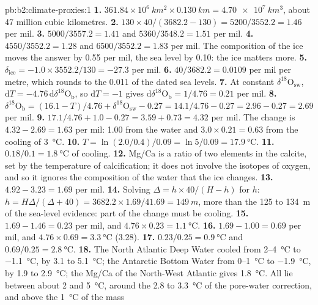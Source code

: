 \begin{solution}{pb:b2:climate-proxies:1}
\textbf{1.} $361.84 \times 10^6\ \unit{km^2} \times \qty{0.130}{km} = \qty{4.70e7}{km^3}$, about 47
million cubic kilometres.
\textbf{2.} $130 \times 40/(3682.2 - 130) = 5200/3552.2 = 1.46$ per mil.
\textbf{3.} $5000/3557.2 = 1.41$ and $5360/3548.2 = 1.51$ per mil.
\textbf{4.} $4550/3552.2 = 1.28$ and $6500/3552.2 = 1.83$ per mil. The composition of the ice
moves the answer by \num{0.55} per mil, the sea level by \num{0.10}: the ice matters more.
\textbf{5.} $\delta_{\mathrm{ice}} = -1.0 \times 3552.2/130 = -27.3$ per mil.
\textbf{6.} $40/3682.2 = 0.0109$ per mil per metre, which rounds to the \num{0.011} of the dated
sea levels.
\textbf{7.} At constant $\delta^{18}\mathrm{O}_{\mathrm{sw}}$, $\mathrm{d}T = -4.76\,\mathrm{d}\delta^{18}
\mathrm{O}_{\mathrm{b}}$, so $\mathrm{d}T = -1$ gives $\mathrm{d}\delta^{18}\mathrm{O}_{\mathrm{b}} =
1/4.76 = 0.21$ per mil.
\textbf{8.} $\delta^{18}\mathrm{O}_{\mathrm{b}} = (16.1 - T)/4.76 + \delta^{18}\mathrm{O}_{\mathrm{sw}}
- 0.27 = 14.1/4.76 - 0.27 = 2.96 - 0.27 = 2.69$ per mil.
\textbf{9.} $17.1/4.76 + 1.0 - 0.27 = 3.59 + 0.73 = 4.32$ per mil. The change is $4.32 - 2.69 =
1.63$ per mil: \num{1.00} from the water and $3.0 \times 0.21 = 0.63$ from the cooling of
\qty{3}{\celsius}.
\textbf{10.} $T = \ln(2.0/0.4)/0.09 = \ln 5/0.09 = \qty{17.9}{\celsius}$.
\textbf{11.} $0.18/0.1 = \qty{1.8}{\celsius}$ of cooling.
\textbf{12.} Mg/Ca is a ratio of two elements in the calcite, set by the temperature of
calcification; it does not involve the isotopes of oxygen, and so it ignores the composition of
the water that the ice changes.
\textbf{13.} $4.92 - 3.23 = 1.69$ per mil.
\textbf{14.} Solving $\Delta = h \times 40/(H - h)$ for $h$: $h = H\Delta/(\Delta + 40) = 3682.2
\times 1.69/41.69 = \qty{149}{m}$, more than the 125 to \qty{134}{m} of the sea-level evidence:
part of the change must be cooling.
\textbf{15.} $1.69 - 1.46 = 0.23$ per mil, and $4.76 \times 0.23 = \qty{1.1}{\celsius}$.
\textbf{16.} $1.69 - 1.00 = 0.69$ per mil, and $4.76 \times 0.69 = \qty{3.3}{\celsius}$ (3.28).
\textbf{17.} $0.23/0.25 = \qty{0.9}{\celsius}$ and $0.69/0.25 = \qty{2.8}{\celsius}$.
\textbf{18.} The North Atlantic Deep Water cooled from 2--\qty{4}{\celsius} to \qty{-1.1}{\celsius},
by 3.1 to \qty{5.1}{\celsius}; the Antarctic Bottom Water from 0--\qty{1}{\celsius} to
\qty{-1.9}{\celsius}, by 1.9 to \qty{2.9}{\celsius}; the Mg/Ca of the North-West Atlantic gives
\qty{1.8}{\celsius}. All lie between about 2 and \qty{5}{\celsius}, around the 2.8 to
\qty{3.3}{\celsius} of the pore-water correction, and above the \qty{1}{\celsius} of the mass

\end{solution}
